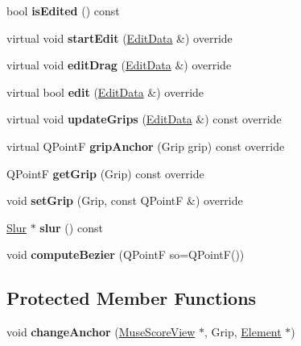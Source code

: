 \begin{DoxyCompactItemize}
bool {\bfseries is\+Edited} () const
\item 
\mbox{\label{class_ms_1_1_slur_segment_aeaff894a59af92a16d16b55dedc3744a}} 
virtual void {\bfseries start\+Edit} (\hyperlink{class_ms_1_1_edit_data}{Edit\+Data} \&) override
\item 
\mbox{\label{class_ms_1_1_slur_segment_a46698846b614381829b9bac35272f171}} 
virtual void {\bfseries edit\+Drag} (\hyperlink{class_ms_1_1_edit_data}{Edit\+Data} \&) override
\item 
\mbox{\label{class_ms_1_1_slur_segment_a342f887d2e5a6903f9ff52e29a6c950b}} 
virtual bool {\bfseries edit} (\hyperlink{class_ms_1_1_edit_data}{Edit\+Data} \&) override
\item 
\mbox{\label{class_ms_1_1_slur_segment_a917fe5f35e36bdb20b45e83acd3f7631}} 
virtual void {\bfseries update\+Grips} (\hyperlink{class_ms_1_1_edit_data}{Edit\+Data} \&) const override
\item 
\mbox{\label{class_ms_1_1_slur_segment_a31d2043d57354c7f0432e98822ca5d96}} 
virtual Q\+PointF {\bfseries grip\+Anchor} (Grip grip) const override
\item 
\mbox{\label{class_ms_1_1_slur_segment_a9827197c22f2099ce38cfa299968e977}} 
Q\+PointF {\bfseries get\+Grip} (Grip) const override
\item 
\mbox{\label{class_ms_1_1_slur_segment_a5cf50c7216a6346155fb865c863b1b7f}} 
void {\bfseries set\+Grip} (Grip, const Q\+PointF \&) override
\item 
\mbox{\label{class_ms_1_1_slur_segment_a6ae20ddf4b32bb5036ac123c8ca75b69}} 
\hyperlink{class_ms_1_1_slur}{Slur} $\ast$ {\bfseries slur} () const
\item 
\mbox{\label{class_ms_1_1_slur_segment_af31d745d03b611ed09b3344f1425dd77}} 
void {\bfseries compute\+Bezier} (Q\+PointF so=Q\+PointF())
\end{DoxyCompactItemize}
\subsection*{Protected Member Functions}
\begin{DoxyCompactItemize}
\item 
\mbox{\label{class_ms_1_1_slur_segment_aeee96b14f51720959f7febd88efd11a1}} 
void {\bfseries change\+Anchor} (\hyperlink{class_ms_1_1_muse_score_view}{Muse\+Score\+View} $\ast$, Grip, \hyperlink{class_ms_1_1_element}{Element} $\ast$)
\end{DoxyCompactItemize}
